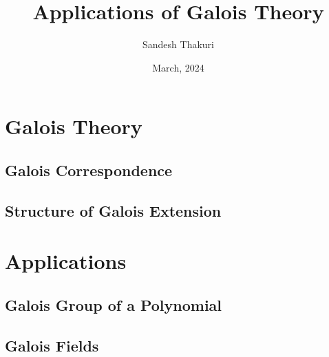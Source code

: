 \documentclass[a4paper,12pt,oneside,onecolumn,openany,final]{memoir}
\title{Applications of Galois Theory}
\author{Sandesh Thakuri}
\date{March, 2024}
\begin{document}
\frontmatter






\tableofcontents  %

\mainmatter



\part{Galois Theory}
\chapter{Galois Correspondence}


%

\chapter{Structure of Galois Extension}




\part{Applications}
\chapter{Galois Group of a Polynomial}


\chapter{Galois Fields}

\end{document}

